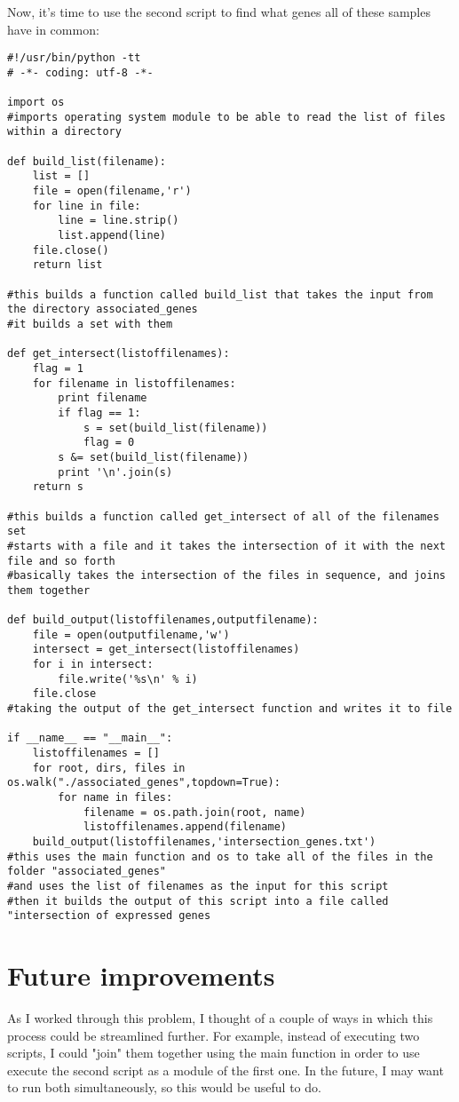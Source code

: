 \documentclass[12pt]{article}
\begin{document}
	Now, it's time to use the second script to find what genes all of these samples have in common: 
	
	\begin{mdframed}[backgroundcolor=light-gray, roundcorner=10pt,leftmargin=1, rightmargin=1, innerleftmargin=15, innertopmargin=15,innerbottommargin=15, outerlinewidth=1, linecolor=light-gray]
\begin{lstlisting}
#!/usr/bin/python -tt
# -*- coding: utf-8 -*-

import os
#imports operating system module to be able to read the list of files within a directory 

def build_list(filename):
    list = []
    file = open(filename,'r')
    for line in file:
        line = line.strip()
        list.append(line)
    file.close()
    return list

#this builds a function called build_list that takes the input from the directory associated_genes
#it builds a set with them

def get_intersect(listoffilenames):
	flag = 1
	for filename in listoffilenames:
		print filename
		if flag == 1:
			s = set(build_list(filename))
			flag = 0
		s &= set(build_list(filename))
		print '\n'.join(s)
	return s

#this builds a function called get_intersect of all of the filenames set
#starts with a file and it takes the intersection of it with the next file and so forth
#basically takes the intersection of the files in sequence, and joins them together

def build_output(listoffilenames,outputfilename):
    file = open(outputfilename,'w')
    intersect = get_intersect(listoffilenames)
    for i in intersect:
        file.write('%s\n' % i)
    file.close
#taking the output of the get_intersect function and writes it to file

if __name__ == "__main__":
	listoffilenames = []
	for root, dirs, files in os.walk("./associated_genes",topdown=True):
		for name in files:
			filename = os.path.join(root, name)
			listoffilenames.append(filename)
	build_output(listoffilenames,'intersection_genes.txt')
#this uses the main function and os to take all of the files in the folder "associated_genes"
#and uses the list of filenames as the input for this script
#then it builds the output of this script into a file called "intersection of expressed genes	\end{lstlisting}
	\end{mdframed}

    
    \section{Future improvements}
    As I worked through this problem, I thought of a couple of ways in which this process could be streamlined further. For example, instead of executing two scripts, I could "join" them together using the main function in order to use execute the second script as a module of the first one. In the future, I may want to run both simultaneously, so this would be useful to do.
    
\end{document}

